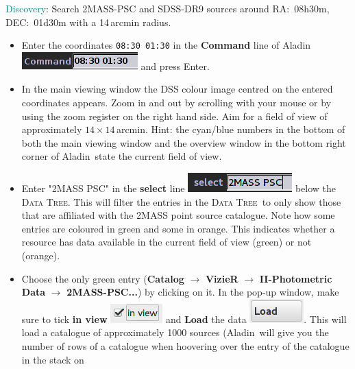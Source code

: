 \documentclass [a4paper, 12pt]{article}
\newcommand{\aladin}{{\textsc{A}{ladin}}}
\newcommand{\datatree}{\textsc{Data Tree}}
\begin{document}
\noindent \textcolor{teal}{Discovery}: Search 2MASS-PSC and SDSS-DR9 sources 
around RA:~08h30m, DEC:~01d30m with a 14\,arcmin radius.
\begin{itemize}
    \item Enter the coordinates \texttt{08:30 01:30} in the \textbf{Command} 
    line of \aladin\ \includegraphics[width=0.2 
    \textwidth]{../images/aladin_command_coordinates.png} and press Enter.
    \item In the main viewing window the DSS colour image centred on the 
    entered coordinates appears. Zoom in and out by scrolling with your mouse 
    or by using the zoom register on the right hand side. Aim for a field of 
    view of approximately $14\times14$\,arcmin. Hint: the 
    cyan/blue numbers in the bottom of both the main viewing window and the 
    overview window in the bottom right corner of \aladin\ state the current 
    field of view. 
    \item Enter "2MASS PSC" in the \textbf{select} line 
    \includegraphics[width=0.17 
    \textwidth]{../images/aladin_select_2mass_psc.png} below the \datatree. 
    This will filter the entries in the \datatree\ to only show those that are 
    affiliated with the 2MASS point source catalogue. Note how some entries are 
    coloured in green and some in orange. This indicates whether a resource 
    has data available in the current field of view (green) or not (orange). 
    \item Choose the only green entry (\textbf{Catalog} $\rightarrow$ 
    \textbf{VizieR} $\rightarrow$ \textbf{II-Photometric Data} $\rightarrow$ 
    \textbf{2MASS-PSC...}) by clicking on it. In the pop-up window, make sure 
    to tick \textbf{in view} \includegraphics[width=0.1 
    \textwidth]{../images/aladin_load_inview.png} and \textbf{Load} the data 
    \includegraphics[width=0.1 
    \textwidth]{../images/aladin_load_load.png}. This will load a catalogue of 
    approximately 1000 sources (\aladin\ will give you the number of rows of a 
    catalogue when hoovering over the entry of the catalogue in the stack on 

\end{itemize}
\end{document}
